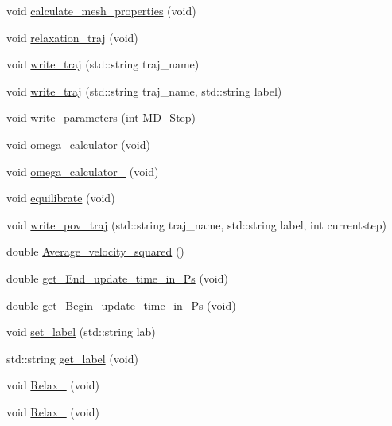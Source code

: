 \begin{DoxyCompactItemize}
\item 
void \mbox{\hyperlink{classMembrane_adb71eee849f346efcd7303241a3469c2}{calculate\+\_\+mesh\+\_\+properties}} (void)
\item 
void \mbox{\hyperlink{classMembrane_aa4286fd20ae452585ec5d19c67268eed}{relaxation\+\_\+traj}} (void)
\item 
void \mbox{\hyperlink{classMembrane_a74ebace0e97952e966f1fe3babf420a7}{write\+\_\+traj}} (std\+::string traj\+\_\+name)
\item 
void \mbox{\hyperlink{classMembrane_ace8dd26e72369937db74fadcab2726aa}{write\+\_\+traj}} (std\+::string traj\+\_\+name, std\+::string label)
\item 
void \mbox{\hyperlink{classMembrane_a1cf1d4947d79a4529239f292534b9e19}{write\+\_\+parameters}} (int M\+D\+\_\+\+Step)
\item 
void \mbox{\hyperlink{classMembrane_a72796df96d3748c43543f10b85d26145}{omega\+\_\+calculator}} (void)
\item 
void \mbox{\hyperlink{classMembrane_a2877e319db184da4fb5294d372400fa0}{omega\+\_\+calculator\+\_}} (void)
\item 
void \mbox{\hyperlink{classMembrane_a3c8f8e0f98162bab1d769b73498ba8c4}{equilibrate}} (void)
\item 
void \mbox{\hyperlink{classMembrane_a4b2c1a070787e45652d2055311b9685d}{write\+\_\+pov\+\_\+traj}} (std\+::string traj\+\_\+name, std\+::string label, int currentstep)
\item 
double \mbox{\hyperlink{classMembrane_a27459fc890e1bc91b9decf1f24593863}{Average\+\_\+velocity\+\_\+squared}} ()
\item 
double \mbox{\hyperlink{classMembrane_acd5030e3aa5206cffbeaf199d05289f5}{get\+\_\+\+End\+\_\+update\+\_\+time\+\_\+in\+\_\+\+Ps}} (void)
\item 
double \mbox{\hyperlink{classMembrane_aca9d4fd3ff412e9ed097c94f04dd2ad3}{get\+\_\+\+Begin\+\_\+update\+\_\+time\+\_\+in\+\_\+\+Ps}} (void)
\item 
void \mbox{\hyperlink{classMembrane_a5d37c481f978d04a64ea0fd10f5e7708}{set\+\_\+label}} (std\+::string lab)
\item 
std\+::string \mbox{\hyperlink{classMembrane_ad59ce2bce11ba48c2a0fc0a86cfca6eb}{get\+\_\+label}} (void)
\item 
void \mbox{\hyperlink{classMembrane_a61d5561da6e815e1b75ac971121fdd28}{Relax\+\_}} (void)
\item 
void \mbox{\hyperlink{classMembrane_ad9b20c6a4e11da731a7981e47b7e35c5}{Relax\+\_}} (void)

\end{DoxyCompactItemize}

